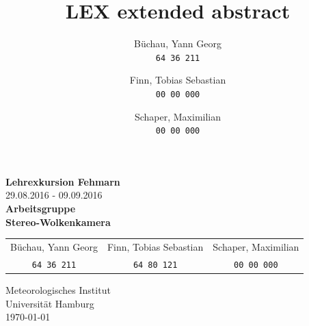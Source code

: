 \documentclass[a4paper,11pt,twoside,german]{article}
\title{LEX extended abstract}
\author{
    Büchau, Yann Georg \\
    \small{\texttt{64\,36\,211}}
    \and
    Finn, Tobias Sebastian \\
    \small{\texttt{00\,00\,000}}
    \and 
    Schaper, Maximilian \\
    \small{\texttt{00\,00\,000}}
    }
\newcommand{\smallborder}{2cm}
\newcommand{\topborder}{1cm}
\newcommand{\bottomborder}{1cm}
\begin{document}
\raggedbottom



\hypersetup{pageanchor=false}
\makeatletter
\begin{titlepage}



\vspace*{\fill}
\begin{center}
\Large{\textbf{Lehrexkursion Fehmarn}}\\
\large{29.08.2016 - 09.09.2016}\\
\vspace{5mm}
\Large{\textbf{Arbeitsgruppe\\Stereo-Wolkenkamera}}\\
\vspace{1cm}

\begin{large}
\begin{tabular}{ccc}
Büchau, Yann Georg & Finn, Tobias Sebastian & Schaper, Maximilian \\
\small{\texttt{64\,36\,211}} & 
\small{\texttt{64\,80\,121}} &
\small{\texttt{00\,00\,000}}
\end{tabular}
\end{large}

\vspace{1cm}
\large{Meteorologisches Institut}\\
\large{Universität Hamburg}\\
\vspace{1cm}
\large{{\today}}
\end{center}
\vspace*{\fill}

\clearpage


\end{titlepage}
\makeatother
\hypersetup{pageanchor=true}

\newpage

\clearpage
\setcounter{page}{1} %

\tableofcontents %
\vspace*{\fill}

\end{document}
